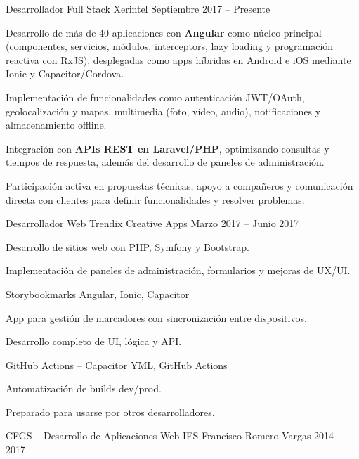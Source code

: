 \documentclass[]{awesome-cv}
\begin{document}
\begin{cventries}
	\cventry
	{Desarrollador Full Stack}
	{Xerintel}
	{}
	{Septiembre 2017 -- Presente}
	{\begin{cvitems}
		\item {Desarrollo de más de 40 aplicaciones con \textbf{Angular} como núcleo principal (componentes, servicios, módulos, interceptors, lazy loading y programación reactiva con RxJS), desplegadas como apps híbridas en Android e iOS mediante Ionic y Capacitor/Cordova.}
		\item {Implementación de funcionalidades como autenticación JWT/OAuth, geolocalización y mapas, multimedia (foto, vídeo, audio), notificaciones y almacenamiento offline.}
		\item {Integración con \textbf{APIs REST en Laravel/PHP}, optimizando consultas y tiempos de respuesta, además del desarrollo de paneles de administración.}
		\item {Participación activa en propuestas técnicas, apoyo a compañeros y comunicación directa con clientes para definir funcionalidades y resolver problemas.}
	\end{cvitems}}

	\cventry
	{Desarrollador Web}
	{Trendix Creative Apps}
	{}
	{Marzo 2017 -- Junio 2017}
	{\begin{cvitems}
		\item {Desarrollo de sitios web con PHP, Symfony y Bootstrap.}
		\item {Implementación de paneles de administración, formularios y mejoras de UX/UI.}
	\end{cvitems}}
\end{cventries}

\begin{cventries}
	\cventry
	{}
	{Storybookmarks}
	{Angular, Ionic, Capacitor}
	{}
	{\begin{cvsectionnormaltext}
		\item {App para gestión de marcadores con sincronización entre dispositivos.}
		\item {Desarrollo completo de UI, lógica y API.}
	\end{cvsectionnormaltext}}

	\cventry
	{}
	{GitHub Actions -- Capacitor}
	{YML, GitHub Actions}
	{}
	{\begin{cvsectionnormaltext}
		\item {Automatización de builds dev/prod.}
		\item {Preparado para usarse por otros desarrolladores.}
	\end{cvsectionnormaltext}}
\end{cventries}

\begin{cventries}
	\cventry
	{}
	{CFGS -- Desarrollo de Aplicaciones Web}
	{IES Francisco Romero Vargas}
	{}
	{2014 -- 2017}
\end{cventries}
\end{document}
